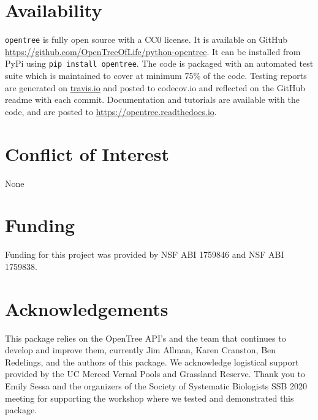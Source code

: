 \documentclass[oupdraft]{sysbio_sse}
\begin{document}
\section{Availability}
\label{sec6}

\texttt{opentree} is fully open source with a CC0 license. It is available on GitHub \url{ https://github.com/OpenTreeOfLife/python-opentree}. It can be installed from PyPi using \texttt{pip install opentree}. The code is packaged with an automated test suite which is maintained to cover at minimum 75\% of the code. Testing reports are generated on \url{travis.io} and posted to {codecov.io} and reflected on the GitHub readme with each commit. Documentation and tutorials are available with the code, and are posted to \url{https://opentree.readthedocs.io}.


\section{Conflict of Interest}
None

\section{Funding}
Funding for this project was provided by NSF ABI 1759846 and NSF ABI 1759838.

\section{Acknowledgements}
This package relies on the OpenTree API's and the team that continues to develop and improve them, currently Jim Allman, Karen Cranston, Ben Redelings, and the authors of this package. We acknowledge logistical support provided by the UC Merced Vernal Pools and Grassland Reserve.
Thank you to Emily Sessa and the organizers of the Society of Systematic Biologists SSB 2020 meeting for supporting the workshop where we tested and demonstrated this package.

\end{document}
